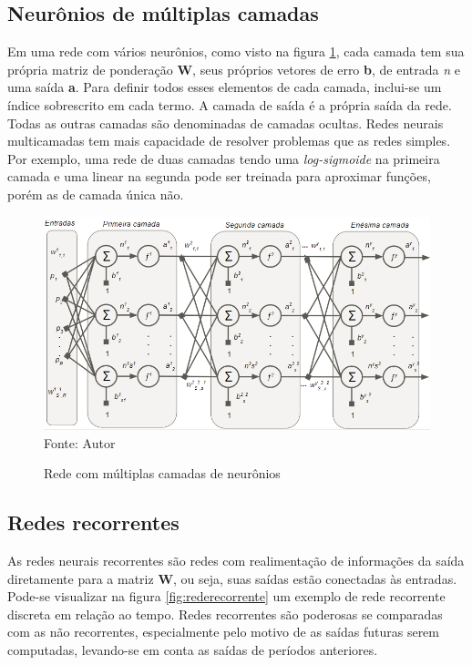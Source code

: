 \documentclass[
	12pt,				%
    oneside,			%
	a4paper,			%
	english,			%
	french,				%
	spanish,			%
	brazil,				%
	]{abntex2}
\begin{document}
\subsection {Neurônios de múltiplas camadas} 

Em uma rede com vários neurônios, como visto na figura \ref{fig:Neuronio_multipla_camada}, cada camada tem sua própria matriz de ponderação \textbf{W}, seus próprios vetores de erro \textbf{b}, de entrada \textit{n} e uma saída \textbf{a}. Para definir todos esses elementos de cada camada, inclui-se um índice sobrescrito em cada termo. A camada de saída é a própria saída da rede. Todas as outras camadas são denominadas de camadas ocultas. 
Redes neurais multicamadas tem mais capacidade de resolver problemas que as redes simples. Por exemplo, uma rede de duas camadas tendo uma \textit{log-sigmoide} na primeira camada e uma linear na segunda pode ser treinada para aproximar funções, porém as de camada única não. 

\begin{figure}[H]
    \centering
    \caption{Rede com múltiplas camadas de neurônios}
    \includegraphics[scale=0.65]{neuronio_multi_camada1}\\
    Fonte: Autor\hfill
    \label{fig:Neuronio_multipla_camada}
\end{figure}

\subsection {Redes recorrentes}

As redes neurais recorrentes são redes com realimentação de informações da saída diretamente para a matriz \textbf{W}, ou seja, suas saídas estão conectadas às entradas. Pode-se visualizar na figura \ref{fig:rederecorrente} um exemplo de rede recorrente discreta em relação ao tempo. Redes recorrentes são poderosas se comparadas com as não recorrentes, especialmente pelo motivo de as saídas futuras serem computadas, levando-se em conta as saídas de períodos anteriores.
\end{document}
